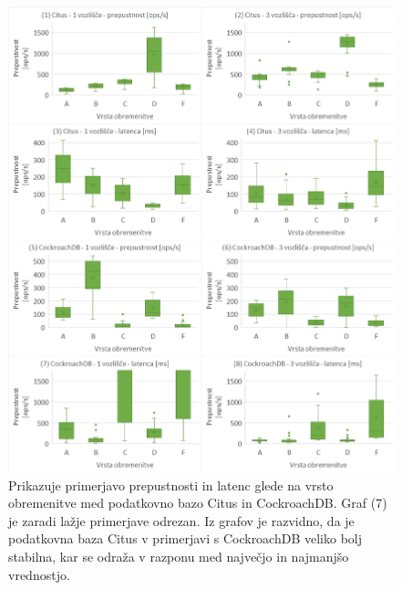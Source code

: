 \documentclass[a4paper, 12pt]{book}
\begin{document}
\newpage

\begin{figure}[H]
\begin{center}
\includegraphics[width=1\textwidth]{resources/comparison-throughputnlatency-bnw.png}
\end{center}
\caption{Prikazuje primerjavo prepustnosti in latenc glede na vrsto obremenitve med podatkovno bazo Citus in CockroachDB. Graf (7) je zaradi lažje primerjave odrezan. Iz grafov je razvidno, da je podatkovna baza Citus v primerjavi s CockroachDB veliko bolj stabilna, kar se odraža v razponu med največjo in najmanjšo vrednostjo.}
\label{img_ycsb_results_bnw_comparison}
\end{figure}

\newpage
\end{document}
